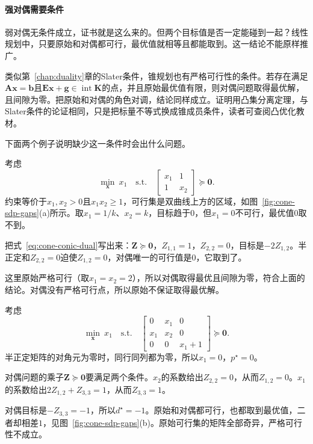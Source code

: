 \paragraph{强对偶需要条件}
弱对偶无条件成立，证书就是这么来的。但两个目标值是否一定能碰到一起？线性规划中，只要原始和对偶都可行，最优值就相等且都能取到。这一结论不能原样推广。

类似第~\ref{chap:duality}章的Slater条件，锥规划也有严格可行性的条件。若存在满足$\bm{A}\bm{x}=\bm{b}$且$\bm{E}\bm{x}+\bm{g}\in\operatorname{int}\bm{K}$的点，并且原始最优值有限，则对偶问题取得最优解，且间隙为零。把原始和对偶的角色对调，结论同样成立。证明用凸集分离定理，与Slater条件的论证相同，只是把标量不等式换成锥成员条件，读者可查阅凸优化教材。

下面两个例子说明缺少这一条件时会出什么问题。

\begin{example}[最优值取不到]
\label{ex:cone-non-attain}
考虑
\[
 \min_{\bm{x}}\ x_1\quad\text{s.t.}\quad\begin{bmatrix}x_1&1\\1&x_2\end{bmatrix}\succeq\bm{0}.
\]
约束等价于$x_1,x_2>0$且$x_1x_2\geq1$，可行集是双曲线上方的区域，如图~\ref{fig:cone-sdp-gaps}(a)所示。取$x_1=1/k$、$x_2=k$，目标趋于$0$，但$x_1=0$不可行，最优值$0$取不到。

把式~\eqref{eq:cone-conic-dual}写出来：$\bm{Z}\succeq\bm{0}$，$Z_{1,1}=1$，$Z_{2,2}=0$，目标是$-2Z_{1,2}$。半正定和$Z_{2,2}=0$迫使$Z_{1,2}=0$，对偶唯一的可行值是$0$，它取到了。

这里原始严格可行（取$x_1=x_2=2$），所以对偶取得最优且间隙为零，符合上面的结论。对偶没有严格可行点，所以原始不保证取得最优解。
\end{example}

\begin{example}[正的对偶间隙]
\label{ex:cone-positive-gap}
考虑
\[
 \min_{\bm{x}}\ x_1\quad\text{s.t.}\quad\begin{bmatrix}0&x_1&0\\x_1&x_2&0\\0&0&x_1+1\end{bmatrix}\succeq\bm{0}.
\]
半正定矩阵的对角元为零时，同行同列都为零，所以$x_1=0$，$p^\star=0$。

对偶问题的乘子$\bm{Z}\succeq\bm{0}$要满足两个条件。$x_2$的系数给出$Z_{2,2}=0$，从而$Z_{1,2}=0$。$x_1$的系数给出$2Z_{1,2}+Z_{3,3}=1$，从而$Z_{3,3}=1$。

对偶目标是$-Z_{3,3}=-1$，所以$d^\star=-1$。原始和对偶都可行，也都取到最优值，二者却相差$1$，见图~\ref{fig:cone-sdp-gaps}(b)。原始可行集的矩阵全部奇异，严格可行性不成立。
\end{example}

